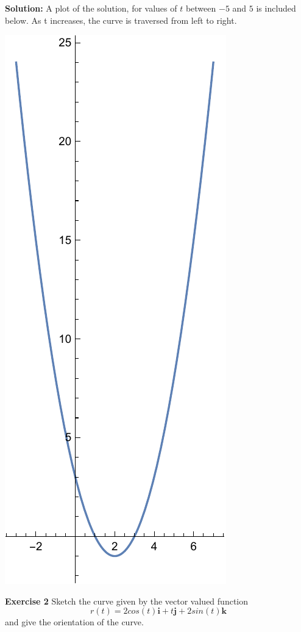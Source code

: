 \documentclass[12pt,oneside]{exam}
\newenvironment{exercise}[1]{\vspace{.1in}\noindent\textbf{Exercise #1 \hspace{.05em}}}{}
\newenvironment{newsolution}{\vspace{.1in}\noindent\textbf{Solution: \hspace{.05em}}}{}
\begin{document}
\begin{newsolution} 
A plot of the solution, for values of $t$ between $-5$ and $5$ is included below. As t increases, the curve is traversed from left to right. 
\begin{center}
\includegraphics[scale=0.5]{p1.pdf}
\end{center}
\end{newsolution}

\begin{exercise}{2}
Sketch the curve given by the vector valued function
\begin{equation*}
r(t) = 2cos(t)\mathbf{i} + t\mathbf{j} + 2sin(t)\mathbf{k}
\end{equation*}
and give the orientation of the curve.
\end{exercise}
\end{document}

